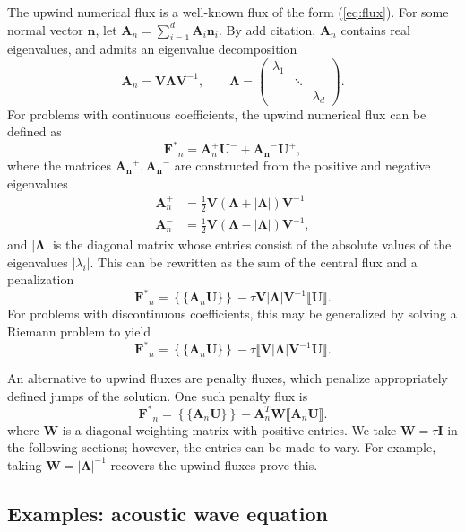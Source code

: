 \documentclass[10pt]{article}
\newcommand{\LRp}[1]{\left( #1 \right)}
\newcommand{\LRb}[1]{\left| #1 \right|}
\newcommand{\LRc}[1]{\left\{ #1 \right\}}
\newcommand{\jump}[1] {\ensuremath{\llbracket#1\rrbracket}}
\newcommand{\avg}[1] {\ensuremath{\LRc{\!\{#1\}\!}}}
\newcommand{\note}[1]{{\color{blue}#1}}
\begin{document}
The upwind numerical flux is a well-known flux of the form (\ref{eq:flux}).  For some normal vector $\bm{n}$, let ${\bm{A}}_n = \sum_{i=1}^d {\bm{A}_i\bm{n}_i}$.  By \note{add citation}, ${\bm{A}}_n$ contains real eigenvalues, and admits an eigenvalue decomposition
\[
\bm{A}_n = \bm{V}{\bm{\Lambda}}\bm{V}^{-1}, \qquad \bm{\Lambda} = 
\left(\begin{array}{ccc}
\lambda_1 & & \\
& \ddots & \\
& & \lambda_d
\end{array}\right).
\]
For problems with continuous coefficients, the upwind numerical flux can be defined as
\[
\bm{F^*}_n = \bm{A}_n^+\bm{U}^- + \bm{A_n}^- \bm{U}^+,
\]
where the matrices $\bm{A_n}^+,\bm{A_n}^-$ are constructed from the positive and negative eigenvalues 
\begin{align*}
\bm{A}_n^+ &= \frac{1}{2}\bm{V} \LRp{\bm{\Lambda} + \LRb{\bm{\Lambda}}} \bm{V}^{-1}\\
\bm{A}_n^- &= \frac{1}{2}\bm{V} \LRp{\bm{\Lambda} - \LRb{\bm{\Lambda}}} \bm{V}^{-1},
\end{align*}
and $\LRb{\bm{\Lambda}}$ is the diagonal matrix whose entries consist of the absolute values of the eigenvalues $\LRb{\lambda_i}$.  This can be rewritten as the sum of the central flux and a penalization
\[
\bm{F^*}_n = \avg{\bm{A}_n\bm{U}} - \tau\bm{V}\LRb{\bm{\Lambda}}\bm{V}^{-1} \jump{\bm{U}}.  
\]
For problems with discontinuous coefficients, this may be generalized by solving a Riemann problem to yield
\[
\bm{F^*}_n = \avg{\bm{A}_n\bm{U}} - \tau \jump{{\bm{V}\LRb{\bm{\Lambda}}\bm{V}^{-1}\bm{U}}}.  
\]


An alternative to upwind fluxes are penalty fluxes, which penalize appropriately defined jumps of the solution.  One such penalty flux is 
\[
\bm{F^*}_n = \avg{\bm{A}_n\bm{U}} - \bm{A}_n^T \bm{W} \jump{\bm{A}_n\bm{U}}.  
\]
where $\bm{W}$ is a diagonal weighting matrix with positive entries.  We take $\bm{W} = \tau \bm{I}$ in the following sections; however, the entries can be made to vary.  For example, taking $\bm{W} = \LRb{\bm{\Lambda}}^{-1}$ recovers the upwind fluxes \note{prove this}.

\subsection{Examples: acoustic wave equation}
\end{document}
